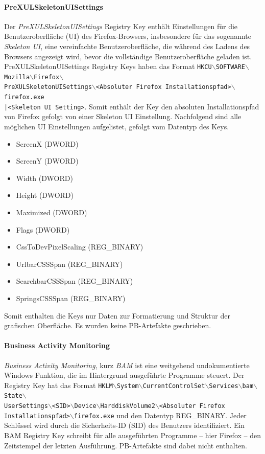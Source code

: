 \begin{appendices}
\paragraph*{PreXULSkeletonUISettings}
Der \textit{PreXULSkeletonUISettings} Registry Key enthält Einstellungen für die Benutzeroberfläche (UI) des Firefox-Browsers, insbesondere für das sogenannte \textit{Skeleton UI}, eine vereinfachte Benutzeroberfläche, die während des Ladens des Browsers angezeigt wird, bevor die vollständige Benutzeroberfläche geladen ist. 
PreXULSkeletonUISettings Registry Keys haben das Format \texttt{HKCU$\backslash$SOFTWARE$\backslash$Mozilla$\backslash$Firefox$\backslash$\\PreXULSkeletonUISettings$\backslash$<Absoluter Firefox Installationspfad>$\backslash$firefox.exe\\|<Skeleton UI Setting>}.
Somit enthält der Key den absoluten Installationspfad von Firefox gefolgt von einer Skeleton UI Einstellung. Nachfolgend sind alle möglichen UI Einstellungen aufgelistet, gefolgt vom Datentyp des Keys. \cite{Mills.2021}
\begin{itemize}
	\item ScreenX (DWORD)
	\item ScreenY (DWORD)
	\item Width (DWORD)
	\item Height (DWORD)
	\item Maximized (DWORD)
	\item Flags (DWORD)
	\item CssToDevPixelScaling (REG\_BINARY)
	\item UrlbarCSSSpan (REG\_BINARY)
	\item SearchbarCSSSpan (REG\_BINARY)
	\item SpringsCSSSpan (REG\_BINARY)
\end{itemize}
Somit enthalten die Keys nur Daten zur Formatierung und Struktur der grafischen Oberfläche. Es wurden keine PB-Artefakte geschrieben.

\paragraph*{Business Activity Monitoring}
\textit{Business Activity Monitoring}, kurz \textit{BAM} ist eine weitgehend undokumentierte Windows Funktion, die im Hintergrund ausgeführte Programme steuert.
Der Registry Key hat das Format \texttt{HKLM$\backslash$System$\backslash$CurrentControlSet$\backslash$Services$\backslash$bam$\backslash$State$\backslash$\\UserSettings$\backslash$<SID>$\backslash$Device$\backslash$HarddiskVolume2$\backslash$<Absoluter Firefox\\ Installationspfad>$\backslash$firefox.exe} und den Datentyp REG\_BINARY.
Jeder Schlüssel wird durch die Sicherheits-ID (SID) des Benutzers identifiziert.
Ein BAM Registry Key schreibt für alle ausgeführten Programme -- hier Firefox -- den Zeitstempel der letzten Ausführung.
PB-Artefakte sind dabei nicht enthalten. \cite{MandiOhlinger.05.06.2023, InfoSecNotes.05.06.2023}


\end{appendices}
